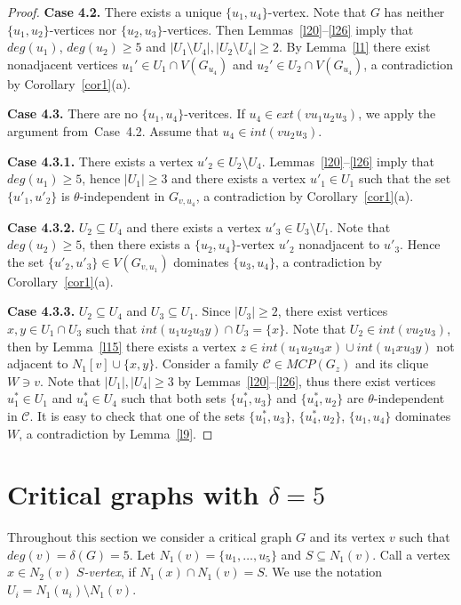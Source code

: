 \documentclass[12pt]{article}
\begin{document}
\begin{proof}
\textbf{Case 4.2.} There exists a unique $\{u_1,u_4\}$-vertex. Note that $G$ has neither $\{u_1,u_2\}$-vertices nor $\{u_2,u_3\}$-vertices. Then Lemmas~\ref{l20}--\ref{l26} imply that $deg(u_1)$, $deg(u_2) \geq 5$ and $|U_1 \setminus U_4|, |U_2 \setminus U_4| \geq 2$. By Lemma~\ref{l1} there exist nonadjacent vertices $u_1' \in U_1 \cap V(G_{u_4})$ and $u_2' \in U_2 \cap V(G_{u_4})$, a contradiction by Corollary~\ref{cor1}(a).

\textbf{Case 4.3.} There are no $\{u_1,u_4\}$-veritces. If $u_4 \in ext(vu_1u_2u_3)$, we apply the argument from~Case~4.2. Assume that $u_4 \in int(vu_2u_3)$. 

\textbf{Case 4.3.1.} There exists a vertex $u'_2 \in U_2 \setminus U_4$. Lemmas~\ref{l20}--\ref{l26} imply that $deg(u_1) \geq 5$, hence $|U_1| \geq 3$ and there exists a vertex $u'_1 \in U_1$ such that the set $\{u'_1,u'_2\}$ is $\theta$-independent in $G_{v,u_4}$, a contradiction by Corollary~\ref{cor1}(a). 

\textbf{Case 4.3.2.} $U_2 \subseteq U_4$ and there exists a vertex $u'_3 \in U_3 \setminus U_1$. Note that $deg(u_2) \geq 5$, then there exists a $\{u_2,u_4\}$-vertex $u'_2$ nonadjacent to $u'_3$. Hence the set $\{u'_2,u'_3\} \in V(G_{v,u_1})$ dominates $\{u_3,u_4\}$, a contradiction by Corollary~\ref{cor1}(a).

\textbf{Case 4.3.3.} $U_2 \subseteq U_4$ and $U_3 \subseteq U_1$. Since $|U_3| \geq 2$, there exist vertices $x,y \in U_1 \cap U_3$ such that $int(u_1u_2u_3y) \cap U_3 = \{x\}$. Note that $U_2 \in int(vu_2u_3)$, then by Lemma~\ref{l15} there exists a vertex $z \in int(u_1u_2u_3x) \cup int(u_1xu_3y)$ not adjacent to $N_1[v] \cup \{x,y\}$. Consider a family $\mathcal{C} \in MCP(G_z)$ and its clique $W \ni v$. Note that $|U_1|,|U_4| \geq 3$ by Lemmas~\ref{l20}--\ref{l26}, thus there exist vertices $u^*_1 \in U_1$ and  $u^*_4 \in U_4$ such that both sets $\{u^*_1,u_3\}$ and $\{u^*_4,u_2\}$ are $\theta$-independent in $\mathcal{C}$. It is easy to check that one of the sets $\{u^*_1,u_3\}$, $\{u^*_4,u_2\}$, $\{u_1,u_4\}$ dominates $W$, a contradiction by Lemma~\ref{l9}.
\end{proof}

\section{Critical graphs with $\delta = 5$}

Throughout this section we consider a critical graph $G$ and its vertex $v$ such that $deg(v) = \delta(G) = 5$. Let $N_1(v) = \{u_1,\ldots,u_5\}$ and $S \subseteq N_1(v)$. Call a vertex $x \in N_2(v)$ \textit{$S$-vertex}, if $N_1(x) \cap N_1(v) = S$. We use the notation $U_i =  N_1(u_i) \setminus N_1(v)$.
\end{document}
